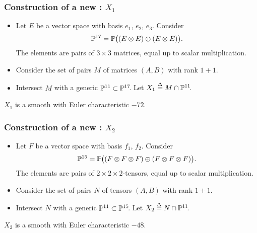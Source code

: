 \begin{frame}
    \frametitle{Construction of a new \CY: $X_1$}

\pause

    \begin{itemize}
	    \item
        Let $E$ be a vector space with basis $e_1$, $e_2$, $e_3$. Consider
        \[
            \P^{17} = \P\big((E \otimes E) \oplus (E \otimes E) \big).
        \]
        The elements are pairs of $3 \times 3$ matrices, equal up to scalar multiplication.
        \pause

        \item
        Consider the set of pairs $M$ of matrices $(A, B)$ with rank $1 + 1$.
        \pause

        \item
        Intersect $M$ with a generic $\P^{11} \subset \P^{17}\mkern-4mu$. Let $X_1 \defeq M \cap \P^{11}\mkern-4mu$.
        \pause
    \end{itemize}

    \begin{theorem}
        $X_1$ is a smooth \CY with Euler characteristic $-72$.
    \end{theorem}
\end{frame}


\begin{frame}
    \frametitle{Construction of a new \CY: $X_2$}

    \begin{itemize}
    	\item Let $F$ be a vector space with basis $f_1$, $f_2$. Consider
	    \[
            \P^{15} = \P\big((F \otimes F \otimes F) \oplus (F \otimes F \otimes F)\big).
	    \]
	    The elements are pairs of $2 \times 2 \times 2$-tensors, equal up to scalar multiplication.

	    \item
	    Consider the set of pairs $N$ of tensors $(A, B)$ with rank $1 + 1$.

	    \item
	    Intersect $N$ with a generic $\P^{11} \subset \P^{15}\mkern-4mu$. Let $X_2 \defeq N \cap \P^{11}\mkern-4mu$.
    \end{itemize}

    \begin{theorem}
        $X_2$ is a smooth \CY with Euler characteristic $-48$.
    \end{theorem}
\end{frame}

